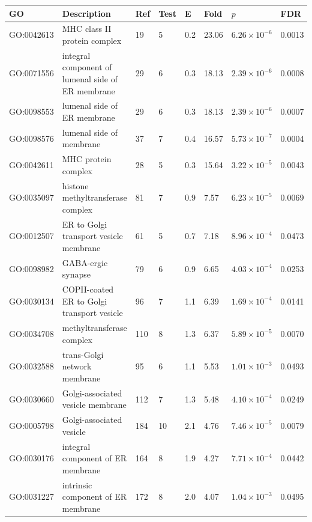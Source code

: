             
\begin{table}[ht]
\centering
  \setlength{\extrarowheight}{2pt}
\begin{adjustbox}{width=\textwidth}

\begin{tabular}{llllllll}

  \toprule
GO & Description & Ref & Test & E & Fold & $p$ & FDR \\ 
  \midrule
GO:0042613 & MHC class II protein complex  & 19 & 5 & 0.2 & 23.06 & $6.26 \times 10^{-6}$ & 0.0013 \\ 
  GO:0071556 & integral component of lumenal side of ER membrane  & 29 & 6 & 0.3 & 18.13 & $2.39 \times 10^{-6}$ & 0.0008 \\ 
  GO:0098553 & lumenal side of ER membrane  & 29 & 6 & 0.3 & 18.13 & $2.39 \times 10^{-6}$ & 0.0007 \\ 
  GO:0098576 & lumenal side of membrane  & 37 & 7 & 0.4 & 16.57 & $5.73 \times 10^{-7}$ & 0.0004 \\ 
  GO:0042611 & MHC protein complex  & 28 & 5 & 0.3 & 15.64 & $3.22 \times 10^{-5}$ & 0.0043 \\ 
  GO:0035097 & histone methyltransferase complex  & 81 & 7 & 0.9 & 7.57 & $6.23 \times 10^{-5}$ & 0.0069 \\ 
  GO:0012507 & ER to Golgi transport vesicle membrane  & 61 & 5 & 0.7 & 7.18 & $8.96 \times 10^{-4}$ & 0.0473 \\ 
  GO:0098982 & GABA-ergic synapse  & 79 & 6 & 0.9 & 6.65 & $4.03 \times 10^{-4}$ & 0.0253 \\ 
  GO:0030134 & COPII-coated ER to Golgi transport vesicle  & 96 & 7 & 1.1 & 6.39 & $1.69 \times 10^{-4}$ & 0.0141 \\ 
  GO:0034708 & methyltransferase complex  & 110 & 8 & 1.3 & 6.37 & $5.89 \times 10^{-5}$ & 0.0070 \\ 
  GO:0032588 & trans-Golgi network membrane  & 95 & 6 & 1.1 & 5.53 & $1.01 \times 10^{-3}$ & 0.0493 \\ 
  GO:0030660 & Golgi-associated vesicle membrane  & 112 & 7 & 1.3 & 5.48 & $4.10 \times 10^{-4}$ & 0.0249 \\ 
  GO:0005798 & Golgi-associated vesicle  & 184 & 10 & 2.1 & 4.76 & $7.46 \times 10^{-5}$ & 0.0079 \\ 
  GO:0030176 & integral component of ER membrane  & 164 & 8 & 1.9 & 4.27 & $7.71 \times 10^{-4}$ & 0.0442 \\ 
  GO:0031227 & intrinsic component of ER membrane  & 172 & 8 & 2.0 & 4.07 & $1.04 \times 10^{-3}$ & 0.0495 \\ 

\end{tabular}
\end{adjustbox}
\end{table}
